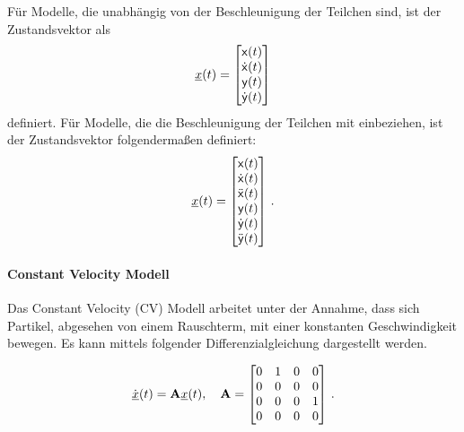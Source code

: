 Für Modelle, die unabhängig von der Beschleunigung der Teilchen sind, ist der Zustandsvektor als 
% 
\begin{equation} \label{eq:definitionCV}
    {\underline{x}}(t) = 
    \begin{bmatrix}
        \mathsf{x}(t) \\
        \dot{\mathsf{x}}(t) \\
        \mathsf{y}(t) \\
        \dot{\mathsf{y}}(t)
       \end{bmatrix} 
\end{equation}
% 
definiert.
Für Modelle, die die Beschleunigung der Teilchen mit einbeziehen, ist der Zustandsvektor folgendermaßen definiert:
% 
\begin{equation} \label{eq:definitionCA}
    {\underline{x}}(t) = 
    \begin{bmatrix}
        \mathsf{x}(t) \\
        \dot{\mathsf{x}}(t) \\
        \ddot{\mathsf{x}}(t) \\
        \mathsf{y}(t) \\
        \dot{\mathsf{y}}(t) \\
        \ddot{\mathsf{y}}(t)
       \end{bmatrix} \, .
\end{equation}
% 

\paragraph{Constant Velocity Modell}

Das Constant Velocity (CV) Modell arbeitet unter der Annahme, dass sich Partikel, 
abgesehen von einem Rauschterm, mit einer konstanten Geschwindigkeit bewegen.
Es kann mittels folgender Differenzialgleichung dargestellt werden.

\begin{equation*} \label{eq:speedCV}
    \dot{{\underline{x}}}(t) = {{\mathbf{A}}}{\underline{x}}(t), \quad {\ensuremath{{\mathbf{A}}}} = 
    \begin{bmatrix}
        0 & 1 & 0 & 0 \\
        0 & 0 & 0 & 0 \\
        0 & 0 & 0 & 1\\
        0 & 0 & 0 & 0
    \end{bmatrix} \, .
\end{equation*}

